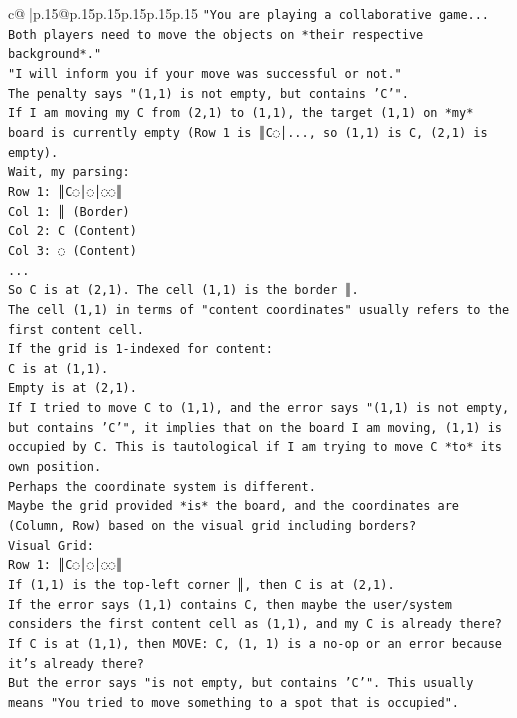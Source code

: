 \documentclass{article}
\begin{document}
{\begin{supertabular}{c@{$\;$}|p{.15\linewidth}@{}p{.15\linewidth}p{.15\linewidth}p{.15\linewidth}p{.15\linewidth}p{.15\linewidth}}
{{{\texttt{"You are playing a collaborative game... Both players need to move the objects on *their respective background*."} \\
\texttt{"I will inform you if your move was successful or not."} \\
\texttt{The penalty says "(1,1) is not empty, but contains 'C'".} \\
\texttt{If I am moving my C from (2,1) to (1,1), the target (1,1) on *my* board is currently empty (Row 1 is ║C◌│..., so (1,1) is C, (2,1) is empty).} \\
\texttt{Wait, my parsing:} \\
\texttt{Row 1: ║C◌│◌│◌◌║} \\
\texttt{Col 1: ║ (Border)} \\
\texttt{Col 2: C (Content)} \\
\texttt{Col 3: ◌ (Content)} \\
\texttt{...} \\
\texttt{So C is at (2,1). The cell (1,1) is the border ║.} \\
\texttt{The cell (1,1) in terms of "content coordinates" usually refers to the first content cell.} \\
\texttt{If the grid is 1{-}indexed for content:} \\
\texttt{C is at (1,1).} \\
\texttt{Empty is at (2,1).} \\
\texttt{If I tried to move C to (1,1), and the error says "(1,1) is not empty, but contains 'C'", it implies that on the board I am moving, (1,1) is occupied by C. This is tautological if I am trying to move C *to* its own position.} \\
\texttt{Perhaps the coordinate system is different.} \\
\texttt{Maybe the grid provided *is* the board, and the coordinates are (Column, Row) based on the visual grid including borders?} \\
\texttt{Visual Grid:} \\
\texttt{Row 1: ║C◌│◌│◌◌║} \\
\texttt{If (1,1) is the top{-}left corner ║, then C is at (2,1).} \\
\texttt{If the error says (1,1) contains C, then maybe the user/system considers the first content cell as (1,1), and my C is already there?} \\
\texttt{If C is at (1,1), then MOVE: C, (1, 1) is a no{-}op or an error because it's already there?} \\
\texttt{But the error says "is not empty, but contains 'C'". This usually means "You tried to move something to a spot that is occupied".} \\
}}}
\end{supertabular}}
\end{document}
